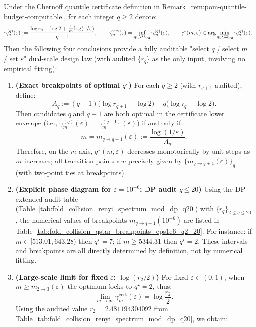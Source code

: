 \begin{remark}\label{rem:pom-qstar-phase-diagram-breakpoints}
Under the Chernoff quantile certificate definition in Remark~\ref{rem:pom-quantile-budget-computable}, for each integer $q\ge 2$ denote:
\[
\gamma^{(q)}_m(\varepsilon)
:=
\frac{\log r_q-\log 2+\frac{1}{m}\log(1/\varepsilon)}{q-1},
\qquad
\gamma^{\mathrm{cert}}_m(\varepsilon)=\inf_{q\in\ZZ_{\ge 2}}\gamma^{(q)}_m(\varepsilon),
\qquad
q^\star(m,\varepsilon)\in\arg\min_{q\in\ZZ_{\ge 2}}\gamma^{(q)}_m(\varepsilon).
\]
Then the following four conclusions provide a fully auditable "select $q$ / select $m$ / set $\varepsilon$" dual-scale design law (with audited $\{r_q\}$ as the only input, involving no empirical fitting):
\begin{enumerate}
  \item \textbf{(Exact breakpoints of optimal $q^\star$)}
  For each $q\ge 2$ (with $r_{q+1}$ audited), define:
  \[
  A_q
  :=
  (q-1)\bigl(\log r_{q+1}-\log 2\bigr)-q\bigl(\log r_q-\log 2\bigr).
  \]
  Then candidates $q$ and $q+1$ are both optimal in the certificate lower envelope (i.e., $\gamma^{(q)}_m(\varepsilon)=\gamma^{(q+1)}_m(\varepsilon)$) if and only if:
  \[
  m=m_{q\to q+1}(\varepsilon):=\frac{\log(1/\varepsilon)}{A_q}.
  \]
  Therefore, on the $m$ axis, $q^\star(m,\varepsilon)$ decreases monotonically by unit steps as $m$ increases; all transition points are precisely given by $\{m_{q\to q+1}(\varepsilon)\}_q$ (with two-point ties at breakpoints).
  \item \textbf{(Explicit phase diagram for $\varepsilon=10^{-6}$; DP audit $q\le 20$)}
  Using the DP extended audit table (Table~\ref{tab:fold_collision_renyi_spectrum_mod_dp_q20}) with $\{r_q\}_{2\le q\le 20}$, the numerical values of breakpoints $m_{q\to q+1}(10^{-6})$ are listed in Table~\ref{tab:fold_collision_qstar_breakpoints_eps1e6_q2_20}.
  For instance: if $m\in[513.01,643.28)$ then $q^\star=7$; if $m\ge 5344.31$ then $q^\star=2$. These intervals and breakpoints are all directly determined by definition, not by numerical fitting.
  \item \textbf{(Large-scale limit for fixed $\varepsilon$: \texorpdfstring{$\log(r_2/2)$}{log(r2/2)})}
  For fixed $\varepsilon\in(0,1)$, when $m\ge m_{2\to 3}(\varepsilon)$ the optimum locks to $q^\star=2$, thus:
  \[
  \lim_{m\to\infty}\gamma^{\mathrm{cert}}_m(\varepsilon)=\log\frac{r_2}{2}.
  \]
  Using the audited value $r_2=2.481194304092$ from Table~\ref{tab:fold_collision_renyi_spectrum_mod_dp_q20}, we obtain:

\end{enumerate}
\end{remark}
